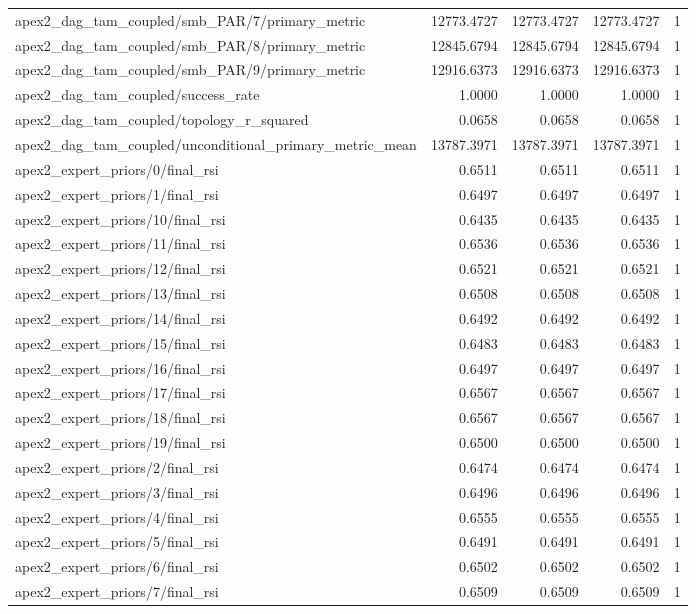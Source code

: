 \begin{table}[h]
\begin{tabular}{lrrrr}
apex2_dag_tam_coupled/smb_PAR/7/primary_metric & 12773.4727 & 12773.4727 & 12773.4727 & 1 \\
apex2_dag_tam_coupled/smb_PAR/8/primary_metric & 12845.6794 & 12845.6794 & 12845.6794 & 1 \\
apex2_dag_tam_coupled/smb_PAR/9/primary_metric & 12916.6373 & 12916.6373 & 12916.6373 & 1 \\
apex2_dag_tam_coupled/success_rate & 1.0000 & 1.0000 & 1.0000 & 1 \\
apex2_dag_tam_coupled/topology_r_squared & 0.0658 & 0.0658 & 0.0658 & 1 \\
apex2_dag_tam_coupled/unconditional_primary_metric_mean & 13787.3971 & 13787.3971 & 13787.3971 & 1 \\
apex2_expert_priors/0/final_rsi & 0.6511 & 0.6511 & 0.6511 & 1 \\
apex2_expert_priors/1/final_rsi & 0.6497 & 0.6497 & 0.6497 & 1 \\
apex2_expert_priors/10/final_rsi & 0.6435 & 0.6435 & 0.6435 & 1 \\
apex2_expert_priors/11/final_rsi & 0.6536 & 0.6536 & 0.6536 & 1 \\
apex2_expert_priors/12/final_rsi & 0.6521 & 0.6521 & 0.6521 & 1 \\
apex2_expert_priors/13/final_rsi & 0.6508 & 0.6508 & 0.6508 & 1 \\
apex2_expert_priors/14/final_rsi & 0.6492 & 0.6492 & 0.6492 & 1 \\
apex2_expert_priors/15/final_rsi & 0.6483 & 0.6483 & 0.6483 & 1 \\
apex2_expert_priors/16/final_rsi & 0.6497 & 0.6497 & 0.6497 & 1 \\
apex2_expert_priors/17/final_rsi & 0.6567 & 0.6567 & 0.6567 & 1 \\
apex2_expert_priors/18/final_rsi & 0.6567 & 0.6567 & 0.6567 & 1 \\
apex2_expert_priors/19/final_rsi & 0.6500 & 0.6500 & 0.6500 & 1 \\
apex2_expert_priors/2/final_rsi & 0.6474 & 0.6474 & 0.6474 & 1 \\
apex2_expert_priors/3/final_rsi & 0.6496 & 0.6496 & 0.6496 & 1 \\
apex2_expert_priors/4/final_rsi & 0.6555 & 0.6555 & 0.6555 & 1 \\
apex2_expert_priors/5/final_rsi & 0.6491 & 0.6491 & 0.6491 & 1 \\
apex2_expert_priors/6/final_rsi & 0.6502 & 0.6502 & 0.6502 & 1 \\
apex2_expert_priors/7/final_rsi & 0.6509 & 0.6509 & 0.6509 & 1 \\

\end{tabular}
\end{table}
